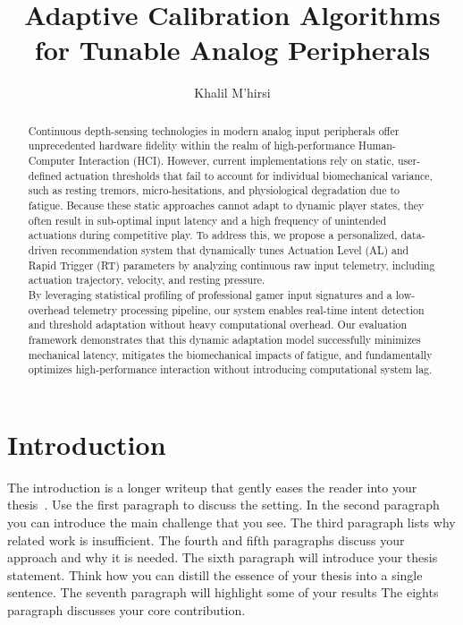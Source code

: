 \documentclass[a4paper,11pt,oneside]{report}
\title{Adaptive Calibration Algorithms\\for Tunable Analog Peripherals}
\author{Khalil M'hirsi}
\begin{document}
\maketitle
\makededication
\makeacks

\begin{abstract}

Continuous depth-sensing technologies in modern analog input peripherals offer unprecedented
hardware fidelity within the realm of high-performance Human-Computer Interaction (HCI).
However, current implementations rely on static, user-defined actuation thresholds that fail 
to account for individual biomechanical variance, such as resting tremors, micro-hesitations,
and physiological degradation due to fatigue. Because these static approaches cannot adapt to
dynamic player states, they often result in sub-optimal input latency and a high frequency of
unintended actuations during competitive play. To address this, we propose a personalized, 
data-driven recommendation system that dynamically tunes Actuation Level (AL) and Rapid Trigger
(RT) parameters by analyzing continuous raw input telemetry, including actuation trajectory,
velocity, and resting pressure. \\

By leveraging statistical profiling of professional gamer input 
signatures and a low-overhead telemetry processing pipeline, our system enables real-time intent
detection and threshold adaptation without heavy computational overhead. Our evaluation framework
demonstrates that this dynamic adaptation model successfully minimizes mechanical latency, 
mitigates the biomechanical impacts of fatigue, and fundamentally optimizes high-performance 
interaction without introducing computational system lag.
\end{abstract}

\maketoc

\chapter{Introduction}

The introduction is a longer writeup that gently eases the reader into your
thesis~\cite{dinesh20oakland}. Use the first paragraph to discuss the setting.
In the second paragraph you can introduce the main challenge that you see.
The third paragraph lists why related work is insufficient.
The fourth and fifth paragraphs discuss your approach and why it is needed.
The sixth paragraph will introduce your thesis statement. Think how you can
distill the essence of your thesis into a single sentence.
The seventh paragraph will highlight some of your results
The eights paragraph discusses your core contribution.
\end{document}
